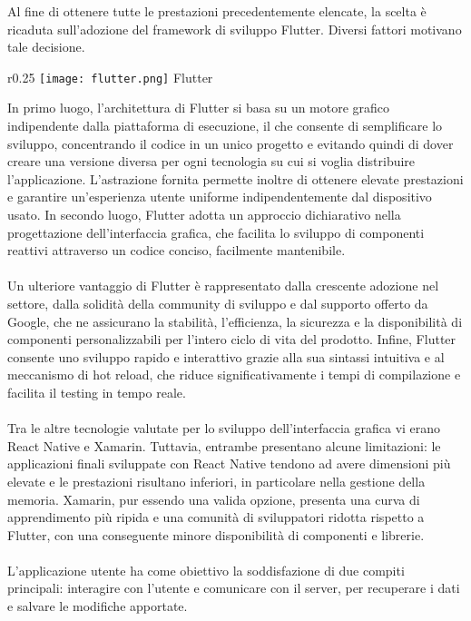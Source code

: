 Al fine di ottenere tutte le prestazioni precedentemente elencate,
la scelta è ricaduta sull’adozione del framework di sviluppo Flutter.
Diversi fattori motivano tale decisione. \\
\begin{wrapfigure}{r}{0.25\textwidth}
    \centering
    \texttt{[image: flutter.png]}
    Flutter
\end{wrapfigure}
In primo luogo, l'architettura di Flutter si basa su un motore grafico
indipendente dalla piattaforma di esecuzione,
il che consente di semplificare lo sviluppo,
concentrando il codice in un unico progetto e
evitando quindi di dover creare una versione diversa
per ogni tecnologia su cui si voglia distribuire l'applicazione.
L'astrazione fornita permette inoltre di ottenere elevate prestazioni e
garantire un'esperienza utente uniforme indipendentemente dal dispositivo usato.
In secondo luogo, Flutter adotta un approccio dichiarativo nella progettazione dell'interfaccia grafica,
che facilita lo sviluppo di componenti reattivi attraverso un codice conciso, facilmente mantenibile.\\
\\
Un ulteriore vantaggio di Flutter è rappresentato dalla crescente adozione nel settore,
dalla solidità della community di sviluppo e dal supporto offerto da Google,
che ne assicurano la stabilità, l'efficienza, la sicurezza e la disponibilità
di componenti personalizzabili per l'intero ciclo di vita del prodotto.
Infine, Flutter consente uno sviluppo rapido e interattivo
grazie alla sua sintassi intuitiva e al meccanismo di hot reload,
che riduce significativamente i tempi di compilazione e facilita il testing in tempo reale.\\
\\
Tra le altre tecnologie valutate per lo sviluppo dell'interfaccia grafica vi erano React Native e Xamarin.
Tuttavia, entrambe presentano alcune limitazioni:
le applicazioni finali sviluppate con React Native tendono ad avere dimensioni più elevate e
le prestazioni risultano inferiori,
in particolare nella gestione della memoria.
Xamarin, pur essendo una valida opzione, presenta una curva di apprendimento più ripida e
una comunità di sviluppatori ridotta rispetto a Flutter,
con una conseguente minore disponibilità di componenti e librerie.\\
\\
L'applicazione utente ha come obiettivo la soddisfazione di due compiti principali:
interagire con l'utente e comunicare con il server,
per recuperare i dati e salvare le modifiche apportate.\\
\\


